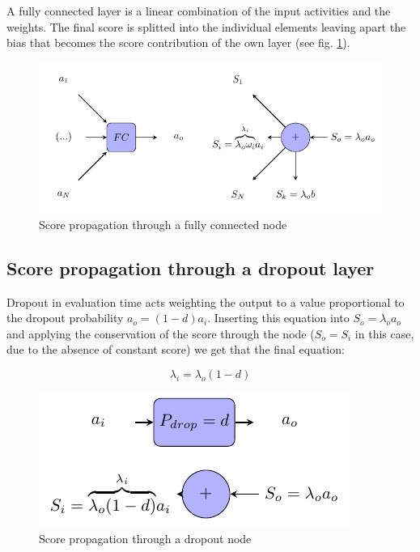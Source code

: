 \documentclass[preprint]{elsarticle}
\theoremstyle{definition} %
\theoremstyle{remark}
\begin{document}
A fully connected layer is a linear combination of the input activities and the weights. The final score is splitted into the individual elements leaving apart the bias that becomes the score contribution of the own layer (see fig. \ref{fig:score_fc}).

\begin{figure}[h!]
	\centering
	\includegraphics{figures/score_fc.pdf}
	\caption{Score propagation through a fully connected node}
	\label{fig:score_fc}
\end{figure}

\subsection{Score propagation through a dropout layer}

Dropout in evaluation time acts weighting the output to a value proportional to the dropout probability $a_o = (1-d)a_i$. Inserting this equation into $S_o = \lambda_o a_o$ and applying the conservation of the score through the node ($S_o = S_i$ in this case, due to the absence of constant score) we get that the final equation:

\begin{equation}
 \lambda_i = \lambda_o (1-d)
\end{equation}

\begin{figure}[h!]
	\centering
	\includegraphics{figures/score_dropout.pdf}
	\caption{Score propagation through a dropout node}
	\label{fig:score_dropout}
\end{figure}
\end{document}
